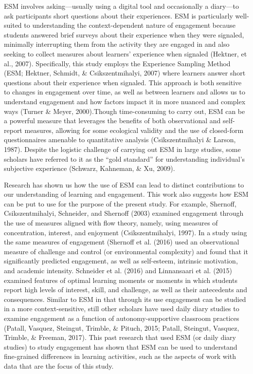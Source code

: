 \documentclass[]{book}
\theoremstyle{definition}
\theoremstyle{definition}
\theoremstyle{definition}
\theoremstyle{remark}
\begin{document}
ESM involves asking---usually using a digital tool and occasionally a
diary---to ask participants short questions about their experiences. ESM
is particularly well-suited to understanding the context-dependent
nature of engagement because students answered brief surveys about their
experience when they were signaled, minimally interrupting them from the
activity they are engaged in and also seeking to collect measures about
learners' experience when signaled (Hektner, et al., 2007).
Specifically, this study employs the Experience Sampling Method (ESM;
Hektner, Schmidt, \& Csikszentmihalyi, 2007) where learners answer short
questions about their experience when signaled. This approach is both
sensitive to changes in engagement over time, as well as between
learners and allows us to understand engagement and how factors impact
it in more nuanced and complex ways (Turner \& Meyer, 2000).Though
time-consuming to carry out, ESM can be a powerful measure that
leverages the benefits of both observational and self-report measures,
allowing for some ecological validity and the use of closed-form
questionnaires amenable to quantitative analysis (Csikszentmihalyi \&
Larson, 1987). Despite the logistic challenge of carrying out ESM in
large studies, some scholars have referred to it as the ``gold
standard'' for understanding individual's subjective experience
(Schwarz, Kahneman, \& Xu, 2009).

Research has shown us how the use of ESM can lead to distinct
contributions to our understanding of learning and engagement. This work
also suggests how ESM can be put to use for the purpose of the present
study. For example, Shernoff, Csikszentmihalyi, Schneider, and Shernoff
(2003) examined engagement through the use of measures aligned with flow
theory, namely, using measures of concentration, interest, and enjoyment
(Csikszentmihalyi, 1997). In a study using the same measures of
engagement (Shernoff et al. (2016) used an observational measure of
challenge and control (or environmental complexity) and found that it
significantly predicted engagement, as well as self-esteem, intrinsic
motivation, and academic intensity. Schneider et al. (2016) and
Linnansaari et al. (2015) examined features of optimal learning moments
or moments in which students report high levels of interest, skill, and
challenge, as well as their antecedents and consequences. Similar to ESM
in that through its use engagement can be studied in a more
context-sensitive, still other scholars have used daily diary studies to
examine engagement as a function of autonomy-supportive classroom
practices (Patall, Vasquez, Steingut, Trimble, \& Pituch, 2015; Patall,
Steingut, Vasquez, Trimble, \& Freeman, 2017). This past research that
used ESM (or daily diary studies) to study engagement has shown that ESM
can be used to understand fine-grained differences in learning
activities, such as the aspects of work with data that are the focus of
this study.
\end{document}
